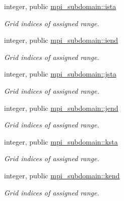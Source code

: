 \textbf{ }\par
\begin{DoxyCompactItemize}
\item 
integer, public \mbox{\hyperlink{namespacempi__subdomain_ab8925faaa6f45326c1d11efa37e03566}{mpi\+\_\+subdomain\+::ista}}
\begin{DoxyCompactList}\small\item\em Grid indices of assigned range. \end{DoxyCompactList}\item 
integer, public \mbox{\hyperlink{namespacempi__subdomain_abbd7d35107c53bcfd2b2b52771f4aa67}{mpi\+\_\+subdomain\+::iend}}
\begin{DoxyCompactList}\small\item\em Grid indices of assigned range. \end{DoxyCompactList}\item 
integer, public \mbox{\hyperlink{namespacempi__subdomain_ac85bfba1caf77f9c3c0047fe9450fee6}{mpi\+\_\+subdomain\+::jsta}}
\begin{DoxyCompactList}\small\item\em Grid indices of assigned range. \end{DoxyCompactList}\item 
integer, public \mbox{\hyperlink{namespacempi__subdomain_a06433a0d1a081c51202a0010c21c9d36}{mpi\+\_\+subdomain\+::jend}}
\begin{DoxyCompactList}\small\item\em Grid indices of assigned range. \end{DoxyCompactList}\item 
integer, public \mbox{\hyperlink{namespacempi__subdomain_acd499eb1d07159aa9f5c878f9519b00f}{mpi\+\_\+subdomain\+::ksta}}
\begin{DoxyCompactList}\small\item\em Grid indices of assigned range. \end{DoxyCompactList}\item 
integer, public \mbox{\hyperlink{namespacempi__subdomain_af9934313b1ccbcb09f30916df3326076}{mpi\+\_\+subdomain\+::kend}}
\begin{DoxyCompactList}\small\item\em Grid indices of assigned range. \end{DoxyCompactList}\end{DoxyCompactItemize}


